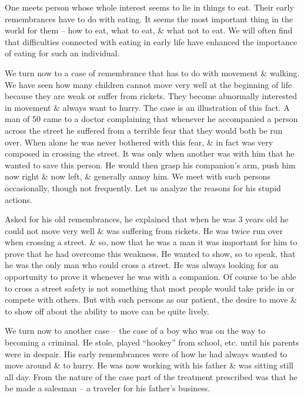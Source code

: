 \documentclass{article}
\numberwithin{equation}{section}
\begin{document}
One meets person whose whole interest seems to lie in things to eat. Their early remembrances have to do with eating. It seems the most important thing in the world for them -- how to eat, what to eat, \& what not to eat. We will often find that difficulties connected with eating in early life have enhanced the importance of eating for such an individual.

We turn now to a case of remembrance that has to do with movement \& walking. We have seen how many children cannot move very well at the beginning of life because they are weak or suffer from rickets. They become abnormally interested in movement \& always want  to hurry. The case is an illustration of this fact. A man of 50 came to a doctor complaining that whenever he accompanied a person across the street he suffered from a terrible fear that they would both be run over. When alone he was never bothered with this fear, \& in fact was very composed in crossing the street. It was only when another was with him that he wanted to save this person. He would then grasp his companion's arm, push him now right \& now left, \& generally annoy him. We meet with such persons occasionally, though not frequently. Let us analyze the reasons for his stupid actions.

Asked for his old remembrances, he explained that when he was 3 years old he could not move very well \& was suffering from rickets. He was twice run over when crossing a street. \& so, now that he was a man it was important for him to prove that he had overcome this weakness. He wanted to show, so to speak, that he was the only man who could cross a street. He was always looking for an opportunity to prove it whenever he was with a companion. Of course to be able to cross a street safety is not something that most people would take pride in or compete with others. But with such persons as our patient, the desire to move \& to show off about the ability to move can be quite lively.

We turn now to another case -- the case of a boy who was on the way to becoming a criminal. He stole, played ``hookey'' from school, etc. until his parents were in despair. His early remembrances were of how he had always wanted to move around \& to hurry. He was now working with his father \& was sitting still all day. From the nature of the case part of the treatment prescribed was that he be made a salesman -- a traveler for his father's business.
\end{document}
